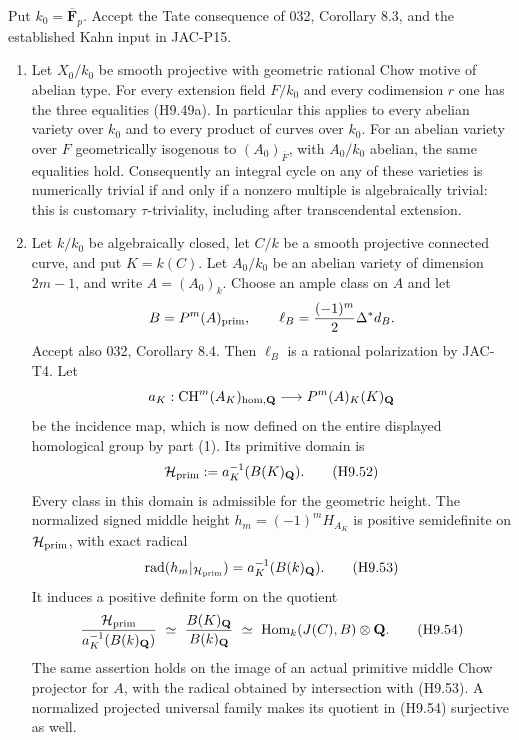\begin{theorem}[H9-T14]\label{h9:T14}
Put $k_0=\overline{\mathbf F}_p$. Accept the Tate consequence of
032, Corollary 8.3, and the established Kahn input in JAC-P15.

\begin{enumerate}
\item
Let $X_0/k_0$ be smooth projective with geometric rational Chow
motive of abelian type. For every extension field $F/k_0$ and every
codimension $r$ one has the three equalities (H9.49a). In particular
this applies to every
abelian variety over $k_0$ and to every product of curves over $k_0$.
For an abelian variety over $F$ geometrically isogenous to
$(A_0)_{\overline F}$, with $A_0/k_0$ abelian, the same equalities
hold. Consequently an integral
cycle on any of these varieties is numerically trivial if and only
if a nonzero multiple is algebraically trivial: this is customary
$\tau$-triviality, including after transcendental extension.

\item
Let $k/k_0$ be algebraically closed, let $C/k$ be a smooth projective
connected curve, and put $K=k(C)$. Let $A_0/k_0$ be an abelian
variety of dimension $2m-1$, and write $A=(A_0)_k$. Choose an ample
class on $A$ and let
\[
 B=P^m(A)_{\rm prim},\qquad
 \ell_B=\frac{(-1)^m}{2}\Delta^*d_B.
\]
Accept also 032, Corollary 8.4. Then $\ell_B$ is a rational
polarization by JAC-T4. Let
\[
 a_K:\operatorname{CH}^m(A_K)_{\rm hom,\mathbf Q}
          \longrightarrow P^m(A)_K(K)_{\mathbf Q}
\]
be the incidence map, which is now defined on the entire displayed
homological group by part (1). Its primitive domain is
\[
 \mathcal H_{\rm prim}
   :=a_K^{-1}(B(K)_{\mathbf Q}).
                                                               \tag{H9.52}
\]
Every class in this domain is admissible for the geometric height.
The normalized signed middle height
$h_m=(-1)^m H_{A_K}$ is positive semidefinite on
$\mathcal H_{\rm prim}$, with exact radical
\[
 \operatorname{rad}(h_m|_{\mathcal H_{\rm prim}})
      =a_K^{-1}(B(k)_{\mathbf Q}).                           \tag{H9.53}
\]
It induces a positive definite form on the quotient
\[
 \frac{\mathcal H_{\rm prim}}
       {a_K^{-1}(B(k)_{\mathbf Q})}
      \ \simeq\
 \frac{B(K)_{\mathbf Q}}{B(k)_{\mathbf Q}}
      \ \simeq\
 \operatorname{Hom}_k(J(C),B)\otimes\mathbf Q.               \tag{H9.54}
\]
The same assertion holds on the image of an actual primitive middle
Chow projector for $A$, with the radical obtained by intersection
with (H9.53). A normalized projected universal family makes its
quotient in (H9.54) surjective as well.
\end{enumerate}
\end{theorem}

